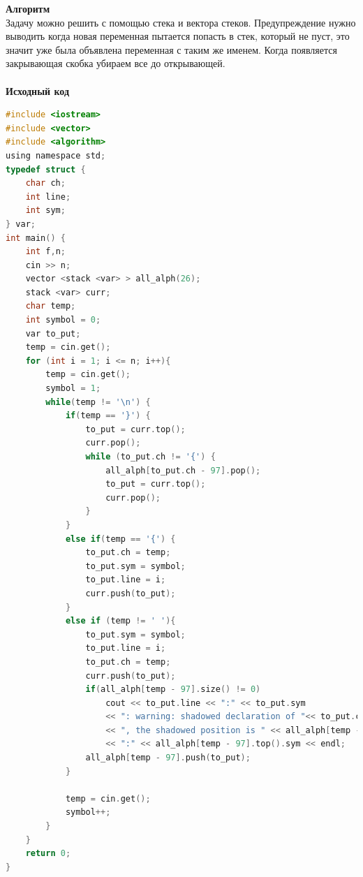 \documentclass[a4paper,12pt]{article}
\begin{document}
\textbf{{\large Алгоритм}} \\
Задачу можно решить с помощью стека и вектора стеков. Предупреждение нужно выводить когда новая переменная пытается попасть в стек, который не пуст, это значит уже была объявлена переменная с таким же именем. Когда появляется закрывающая скобка убираем все до открывающей. \\ 
\\
\newpage
\textbf{{\large Исходный код}}
\begin{lstlisting}[language=C]
#include <iostream>
#include <vector>
#include <algorithm>
using namespace std;
typedef struct {
    char ch;
    int line;
    int sym;
} var;
int main() {
    int f,n;
    cin >> n;
    vector <stack <var> > all_alph(26);
    stack <var> curr;
    char temp;
    int symbol = 0;
    var to_put;
    temp = cin.get();
    for (int i = 1; i <= n; i++){
        temp = cin.get();
        symbol = 1;
        while(temp != '\n') {
            if(temp == '}') {
                to_put = curr.top();
                curr.pop();
                while (to_put.ch != '{') {
                    all_alph[to_put.ch - 97].pop();
                    to_put = curr.top();
                    curr.pop();
                }
            }
            else if(temp == '{') {
                to_put.ch = temp;
                to_put.sym = symbol;
                to_put.line = i;
                curr.push(to_put);
            }
            else if (temp != ' '){
                to_put.sym = symbol;
                to_put.line = i;
                to_put.ch = temp;
                curr.push(to_put);
                if(all_alph[temp - 97].size() != 0)
                    cout << to_put.line << ":" << to_put.sym 
                    << ": warning: shadowed declaration of "<< to_put.ch 
                    << ", the shadowed position is " << all_alph[temp - 97].top().line
                    << ":" << all_alph[temp - 97].top().sym << endl;
                all_alph[temp - 97].push(to_put);
            }
            
            temp = cin.get();
            symbol++;
        }
    }
    return 0;
}
\end{lstlisting}
\end{document}

